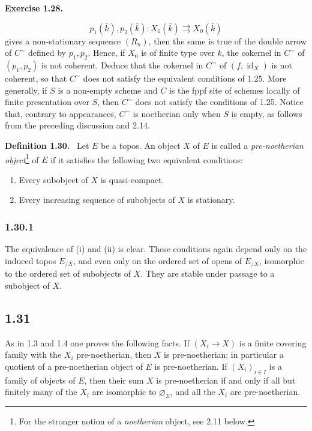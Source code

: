 \documentclass[11pt]{article}
\newcommand{\id}{\operatorname{id}}
\newenvironment{statement}[1]{\par\medskip\noindent\textbf{#1.}\ }{\par\medskip}
\newenvironment{remarktext}[1]{\par\medskip\noindent\textbf{#1.}\ }{\par\medskip}
\begin{document}
\begin{remarktext}{Exercise 1.28}
\begin{enumerate}[label=\alph*)]
\[
p_1(\bar{k}),p_2(\bar{k}):X_1(\bar{k})\rightrightarrows X_0(\bar{k})
\]
gives a non-stationary sequence \((R_n)\), then the same is true of the double arrow of \(C^\sim\) defined by \(p_1,p_2\). Hence, if \(X_0\) is of finite type over \(k\), the cokernel in \(C^\sim\) of \((p_1,p_2)\) is not coherent. Deduce that the cokernel in \(C^\sim\) of \((f,\id_X)\) is not coherent, so that \(C^\sim\) does not satisfy the equivalent conditions of 1.25. More generally, if \(S\) is a non-empty scheme and \(C\) is the fppf site of schemes locally of finite presentation over \(S\), then \(C^\sim\) does not satisfy the conditions of 1.25. Notice that, contrary to appearances, \(C^\sim\) is noetherian only when \(S\) is empty, as follows from the preceding discussion and 2.14.
\end{enumerate}
\end{remarktext}

\begin{statement}{Definition 1.30}
Let \(E\) be a topos. An object \(X\) of \(E\) is called a \emph{pre-noetherian object}\footnote{For the stronger notion of a \emph{noetherian} object, see 2.11 below.} of \(E\) if it satisfies the following two equivalent conditions:
\begin{enumerate}[label=(\roman*)]
\item Every subobject of \(X\) is quasi-compact.
\item Every increasing sequence of subobjects of \(X\) is stationary.
\end{enumerate}
\end{statement}

\subsubsection*{1.30.1}
The equivalence of (i) and (ii) is clear. These conditions again depend only on the induced topos \(E_{/X}\), and even only on the ordered set of opens of \(E_{/X}\), isomorphic to the ordered set of subobjects of \(X\). They are stable under passage to a subobject of \(X\).

\subsection*{1.31}
As in 1.3 and 1.4 one proves the following facts. If \((X_i\to X)\) is a finite covering family with the \(X_i\) pre-noetherian, then \(X\) is pre-noetherian; in particular a quotient of a pre-noetherian object of \(E\) is pre-noetherian. If \((X_i)_{i\in I}\) is a family of objects of \(E\), then their sum \(X\) is pre-noetherian if and only if all but finitely many of the \(X_i\) are isomorphic to \(\varnothing_E\), and all the \(X_i\) are pre-noetherian.
\end{document}
